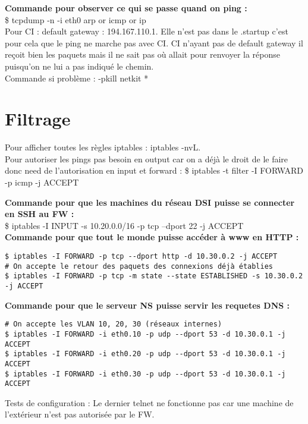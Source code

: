 \documentclass[a4paper]{article}
\begin{document}
\textbf{Commande pour observer ce qui se passe quand on ping :} \\
\$ tcpdump -n -i eth0 arp or icmp or ip \\

Pour CI : default gateway : 194.167.110.1. Elle n'est pas dans le .startup c'est pour cela que le ping ne marche pas avec CI. CI n'ayant pas de default gateway il reçoit bien les paquets mais il ne sait pas où allait pour renvoyer la réponse puisqu'on ne lui a pas indiqué le chemin. \\

Commande si problème : -pkill netkit * \\


	\section{Filtrage}
	
Pour afficher toutes les règles iptables : iptables -nvL. \\

Pour autoriser les pings pas besoin en output car on a déjà le droit de le faire donc need de l'autorisation en input et forward : \$ iptables -t filter -I FORWARD -p icmp -j ACCEPT
	
\textbf{Commande pour que les machines du réseau DSI puisse se connecter en SSH au FW :}\\
\$ iptables -I INPUT -s 10.20.0.0/16 -p tcp --dport 22 -j ACCEPT  \\

\textbf{Commande pour que tout le monde puisse accéder à www en HTTP : }
\begin{verbatim}
$ iptables -I FORWARD -p tcp --dport http -d 10.30.0.2 -j ACCEPT
# On accepte le retour des paquets des connexions déjà établies
$ iptables -I FORWARD -p tcp -m state --state ESTABLISHED -s 10.30.0.2 -j ACCEPT
\end{verbatim}

\textbf{Commande pour que le serveur NS puisse servir les requetes DNS : }
\begin{verbatim}
# On accepte les VLAN 10, 20, 30 (réseaux internes)
$ iptables -I FORWARD -i eth0.10 -p udp --dport 53 -d 10.30.0.1 -j ACCEPT
$ iptables -I FORWARD -i eth0.20 -p udp --dport 53 -d 10.30.0.1 -j ACCEPT
$ iptables -I FORWARD -i eth0.30 -p udp --dport 53 -d 10.30.0.1 -j ACCEPT
\end{verbatim}

Tests de configuration : Le dernier telnet ne fonctionne pas car une machine de l'extérieur n'est pas autorisée par le FW. 
\end{document}
